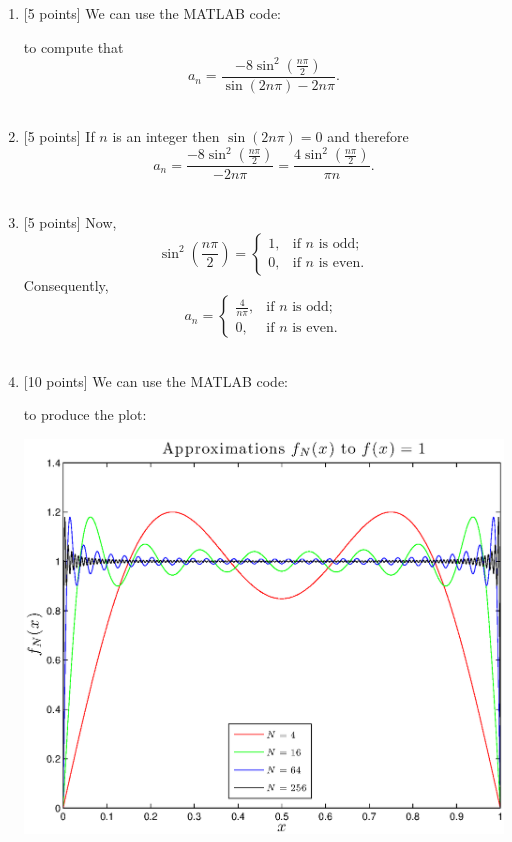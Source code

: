 \begin{solution}
\begin{enumerate}
\item {[5 points]}
We can use the MATLAB code:



to compute that
\[
a_n=\frac{-8\sin^2\left(\frac{n\pi}{2}\right)}{\sin\left(2n\pi\right)-2n\pi}.
\]
\\
\item {[5 points]}
If $n$ is an integer then $\sin\left(2n\pi\right)=0$ and therefore
\[
a_n=\frac{-8\sin^2\left(\frac{n\pi}{2}\right)}{-2n\pi}=\frac{4\sin^2\left(\frac{n\pi}{2}\right)}{\pi n}.
\]
\\
\item {[5 points]}
Now,
\[
\sin^2\left(\frac{n\pi}{2}\right)=\left\{\begin{array}{ll}
\displaystyle{1}, & \mbox{if }n\mbox{ is odd;}
\\
0, & \mbox{if }n\mbox{ is even.}
\end{array}\right.
\]
Consequently,
\[
a_n=\left\{\begin{array}{ll}
\displaystyle{\frac{4}{n\pi}}, & \mbox{if }n\mbox{ is odd;}
\\
0, & \mbox{if }n\mbox{ is even.}
\end{array}\right.
\]
\\
\item {[10 points]}
We can use the MATLAB code:



to produce the plot:
\begin{center}
\includegraphics[scale=0.7]{hw1d.eps}
\end{center}
\end{enumerate}
\end{solution}